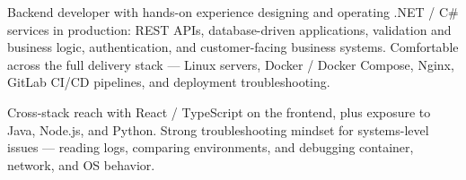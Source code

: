 

\begin{cvparagraph}

Backend developer with hands-on experience designing and operating .NET / C\# services in production: REST APIs, database-driven applications, validation and business logic, authentication, and customer-facing business systems. Comfortable across the full delivery stack --- Linux servers, Docker / Docker Compose, Nginx, GitLab CI/CD pipelines, and deployment troubleshooting.

Cross-stack reach with React / TypeScript on the frontend, plus exposure to Java, Node.js, and Python. Strong troubleshooting mindset for systems-level issues --- reading logs, comparing environments, and debugging container, network, and OS behavior.
\end{cvparagraph}
